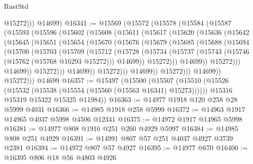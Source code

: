 \begin{lexlean}{RustStd}
\begin{coremodule}
            @15272)))
      @14699)
@16341 := @15569
    (@15572
      (@15578
        (@15584
          (@15587
            (@15593
              (@15596
                (@15602
                  (@15608
                    (@15611
                      (@15617
                        (@15620
                          (@15636
                            (@15642
                              (@15645
                                (@15651
                                  (@15654
                                    (@15670
                                      (@15676
                                        (@15679
                                          (@15685
                                            (@15688
                                              (@15694
                                                (@15700
                                                  (@15703
                                                    (@15709
                                                      (@15712
                                                        (@15728
                                                          (@15734
                                                            (@15737
                                                              (@15743
                                                                (@15746
                                                                  (@15762 (@15768 @16293 @15272)))
                                                                @14699))
                                                            @15272)))
                                                      @14699))
                                                  @15272)))
                                            @14699))
                                        @15272)))
                                  @14699))
                              @15272)))
                        @14699))
                    @15272)))
              @14699))
          @15272)))
    @14699
@16357 := @15497
    (@15500
      (@15507
        (@15510 (@15526 (@15532 (@15538 (@15554 (@15560 (@15563 @16341) @15273))))))
        @15316
        @15319
        @15322
        @15325
        @11984))
@16363 := @14977 @1918 @120 @258 @28 @5999 @4031
@16366 := @14985 @1918 @258 @5999
@16372 := @14963 @1917 @14965 @4037 @5998 @4506 @12341
@16375 := @14972 @1917 @14965 @5998
@16381 := @14977 @808 @1916 @251 @260 @4929 @5997
@16384 := @14985 @808 @251 @4929
@16391 := @14991 @807 @57 @251 @4037 @4927 @3739 @2381
@16394 := @14972 @807 @57 @4927
@16395 := @14977 @670
@16400 := @16395 @806 @18 @56 @4803 @4926

\end{coremodule}
\end{lexlean}
